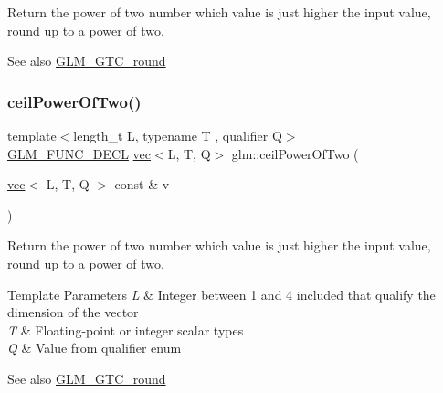 Return the power of two number which value is just higher the input value, round up to a power of two.

\begin{DoxySeeAlso}{See also}
\hyperlink{group__gtc__round}{G\+L\+M\+\_\+\+G\+T\+C\+\_\+round} 
\end{DoxySeeAlso}
\mbox{\label{group__gtc__round_gab53d4a97c0d3e297be5f693cdfdfe5d2}} 
\subsubsection{\texorpdfstring{ceil\+Power\+Of\+Two()}{ceilPowerOfTwo()}\hspace{0.1cm}{\footnotesize\ttfamily [2/2]}}
{\footnotesize\ttfamily template$<$length\+\_\+t L, typename T , qualifier Q$>$ \\
\hyperlink{setup_8hpp_ab2d052de21a70539923e9bcbf6e83a51}{G\+L\+M\+\_\+\+F\+U\+N\+C\+\_\+\+D\+E\+CL} \hyperlink{structglm_1_1vec}{vec}$<$L, T, Q$>$ glm\+::ceil\+Power\+Of\+Two (\begin{DoxyParamCaption}\item[{\hyperlink{structglm_1_1vec}{vec}$<$ L, T, Q $>$ const \&}]{v }\end{DoxyParamCaption})}

Return the power of two number which value is just higher the input value, round up to a power of two.


\begin{DoxyTemplParams}{Template Parameters}
{\em L} & Integer between 1 and 4 included that qualify the dimension of the vector \\
\hline
{\em T} & Floating-\/point or integer scalar types \\
\hline
{\em Q} & Value from qualifier enum\\
\hline
\end{DoxyTemplParams}
\begin{DoxySeeAlso}{See also}
\hyperlink{group__gtc__round}{G\+L\+M\+\_\+\+G\+T\+C\+\_\+round} 
\end{DoxySeeAlso}
\mbox{\label{group__gtc__round_ga2ffa3cd5f2ea746ee1bf57c46da6315e}} 
